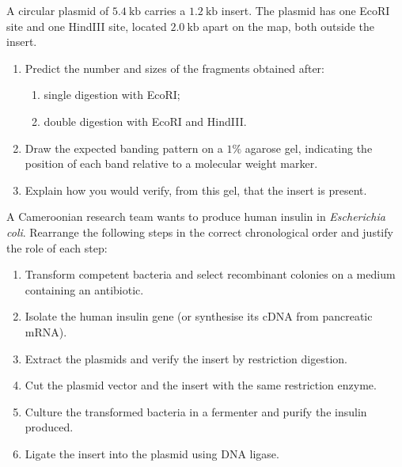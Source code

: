 \documentclass[11pt]{article}
\newcounter{popsec}
\newcounter{popsub}
\newcommand{\courssub}[1]{%
  \stepcounter{popsub}%
  \par\vspace{9pt}\noindent{\popxbold\fontsize{11.5}{13}\selectfont\color{popink}{\color{poporange}\thepopsec.\thepopsub}\hspace{6pt}#1}\par\nopagebreak\vspace{4pt}
}
\begin{document}
\courssub{I practise}

\begin{exercice}
A circular plasmid of $5.4\ \mathrm{kb}$ carries a $1.2\ \mathrm{kb}$ insert. The plasmid has one EcoRI site and one HindIII site, located $2.0\ \mathrm{kb}$ apart on the map, both outside the insert.
\begin{enumerate}
\item Predict the number and sizes of the fragments obtained after:
\begin{enumerate}
\item single digestion with EcoRI;
\item double digestion with EcoRI and HindIII.
\end{enumerate}
\item Draw the expected banding pattern on a $1\%$ agarose gel, indicating the position of each band relative to a molecular weight marker.
\item Explain how you would verify, from this gel, that the insert is present.
\end{enumerate}
\end{exercice}

\begin{exercice}
A Cameroonian research team wants to produce human insulin in \emph{Escherichia coli}. Rearrange the following steps in the correct chronological order and justify the role of each step:
\begin{enumerate}
\item Transform competent bacteria and select recombinant colonies on a medium containing an antibiotic.
\item Isolate the human insulin gene (or synthesise its cDNA from pancreatic mRNA).
\item Extract the plasmids and verify the insert by restriction digestion.
\item Cut the plasmid vector and the insert with the same restriction enzyme.
\item Culture the transformed bacteria in a fermenter and purify the insulin produced.
\item Ligate the insert into the plasmid using DNA ligase.
\end{enumerate}
\end{exercice}
\end{document}
